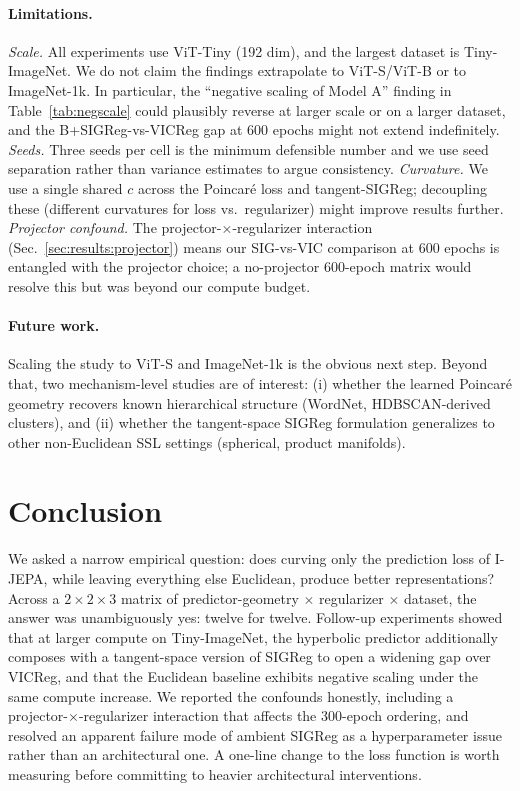 \documentclass{article}
\begin{document}
\paragraph{Limitations.}
\emph{Scale.} All experiments use ViT-Tiny (192 dim), and the largest dataset is Tiny-ImageNet. We do not claim the findings extrapolate to ViT-S/ViT-B or to ImageNet-1k. In particular, the ``negative scaling of Model A'' finding in Table~\ref{tab:negscale} could plausibly reverse at larger scale or on a larger dataset, and the B+SIGReg-vs-VICReg gap at 600 epochs might not extend indefinitely.
\emph{Seeds.} Three seeds per cell is the minimum defensible number and we use seed separation rather than variance estimates to argue consistency.
\emph{Curvature.} We use a single shared $c$ across the Poincar\'{e} loss and tangent-SIGReg; decoupling these (different curvatures for loss vs.\ regularizer) might improve results further.
\emph{Projector confound.} The projector-$\times$-regularizer interaction (Sec.~\ref{sec:results:projector}) means our SIG-vs-VIC comparison at 600 epochs is entangled with the projector choice; a no-projector 600-epoch matrix would resolve this but was beyond our compute budget.

\paragraph{Future work.}
Scaling the study to ViT-S and ImageNet-1k is the obvious next step. Beyond that, two mechanism-level studies are of interest: (i) whether the learned Poincar\'{e} geometry recovers known hierarchical structure (WordNet, HDBSCAN-derived clusters), and (ii) whether the tangent-space SIGReg formulation generalizes to other non-Euclidean SSL settings (spherical, product manifolds).

\section{Conclusion}

We asked a narrow empirical question: does curving only the prediction loss of I-JEPA, while leaving everything else Euclidean, produce better representations? Across a $2{\times}2{\times}3$ matrix of predictor-geometry $\times$ regularizer $\times$ dataset, the answer was unambiguously yes: twelve for twelve. Follow-up experiments showed that at larger compute on Tiny-ImageNet, the hyperbolic predictor additionally composes with a tangent-space version of SIGReg to open a widening gap over VICReg, and that the Euclidean baseline exhibits negative scaling under the same compute increase. We reported the confounds honestly, including a projector-$\times$-regularizer interaction that affects the 300-epoch ordering, and resolved an apparent failure mode of ambient SIGReg as a hyperparameter issue rather than an architectural one. A one-line change to the loss function is worth measuring before committing to heavier architectural interventions.
\end{document}
